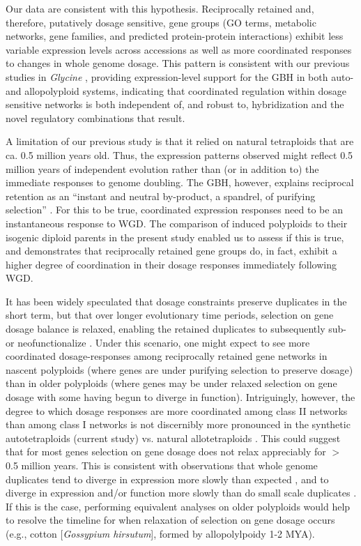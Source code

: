 \documentclass[11pt]{article}
\begin{document}
Our data are consistent with this hypothesis. Reciprocally retained and, therefore, putatively dosage sensitive, gene groups (GO terms, metabolic networks, gene families, and predicted protein-protein interactions) exhibit less variable expression levels across accessions as well as more coordinated responses to changes in whole genome dosage. This pattern is consistent with our previous studies in {\it Glycine} \citep{coate2016}, providing expression-level support for the GBH in both auto- and allopolyploid systems, indicating that coordinated regulation within dosage sensitive networks is both independent of, and robust to, hybridization and the novel regulatory combinations that result.

A limitation of our previous study \citep{coate2016} is that it relied on natural tetraploids that are ca. 0.5 million years old. Thus, the expression patterns observed might reflect 0.5 million years of independent evolution rather than (or in addition to) the immediate responses to genome doubling. The GBH, however, explains  reciprocal retention as an ``instant and neutral by-product, a spandrel, of purifying selection'' \citep{freeling2009}. For this to be true, coordinated expression responses need to be an instantaneous response to WGD. The comparison of induced polyploids to their isogenic diploid parents in the present study enabled us to assess if this is true, and demonstrates that reciprocally retained gene groups do, in fact, exhibit a higher degree of coordination in their dosage responses immediately following WGD.

It has been widely speculated that dosage constraints preserve duplicates in the short term, but that over longer evolutionary time periods, selection on gene dosage balance is relaxed, enabling the retained duplicates to subsequently sub- or neofunctionalize \citep{coate2011, schnable2012, conant2014, coate2016}.
Under this scenario, one might expect to see more coordinated dosage-responses among reciprocally retained gene networks in nascent polyploids (where genes are under purifying selection to preserve dosage) than in older polyploids (where genes may be under relaxed selection on gene dosage with some having begun to diverge in function).
Intriguingly, however, the degree to which dosage responses are more coordinated among class II networks than among class I networks is not discernibly more pronounced in the synthetic autotetraploids (current study) vs. natural allotetraploids \citep{coate2016}.
This could suggest that for most genes selection on gene dosage does not relax appreciably for $>$ 0.5 million years.
This is consistent with observations that whole genome duplicates tend to diverge in expression more slowly than expected \citep{rodgers2012, tasdighian2017}, and to diverge in expression and/or function more slowly than do small scale duplicates \citep{hakes2007, qiao2018, wang2011, rodgers2012, defoort2019}.
If this is the case, performing equivalent analyses on older polyploids would help to resolve the timeline for when relaxation of selection on gene dosage occurs (e.g., cotton [\textit{Gossypium hirsutum}], formed by allopolylpoidy 1-2 MYA).
\end{document}
